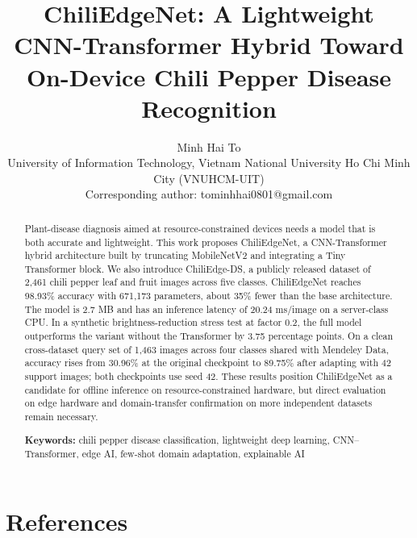 \documentclass[10pt]{article}
\title{\LARGE ChiliEdgeNet: A Lightweight CNN-Transformer Hybrid Toward On-Device Chili Pepper Disease Recognition}
\author{
  \large Minh Hai To\\[2pt]
  \normalsize University of Information Technology, Vietnam National University Ho Chi Minh City (VNUHCM-UIT)\\
  \normalsize Corresponding author: tominhhai0801@gmail.com
}
\date{}
\renewcommand{\_}{\textunderscore\allowbreak}
\begin{document}
\maketitle

\begin{abstract}
\noindent Plant-disease diagnosis aimed at resource-constrained devices needs a model that is both accurate and lightweight. This work proposes ChiliEdgeNet, a CNN-Transformer hybrid architecture built by truncating MobileNetV2 and integrating a Tiny Transformer block. We also introduce ChiliEdge-DS, a publicly released dataset of 2,461 chili pepper leaf and fruit images across five classes. ChiliEdgeNet reaches 98.93\% accuracy with 671,173 parameters, about 35\% fewer than the base architecture. The model is 2.7 MB and has an inference latency of 20.24 ms/image on a server-class CPU. In a synthetic brightness-reduction stress test at factor 0.2, the full model outperforms the variant without the Transformer by 3.75 percentage points. On a clean cross-dataset query set of 1,463 images across four classes shared with Mendeley Data, accuracy rises from 30.96\% at the original checkpoint to 89.75\% after adapting with 42 support images; both checkpoints use seed 42. These results position ChiliEdgeNet as a candidate for offline inference on resource-constrained hardware, but direct evaluation on edge hardware and domain-transfer confirmation on more independent datasets remain necessary.

\noindent\textbf{Keywords:} chili pepper disease classification, lightweight deep learning, CNN--Transformer, edge AI, few-shot domain adaptation, explainable AI
\end{abstract}



\section*{References}
\small

\end{document}
